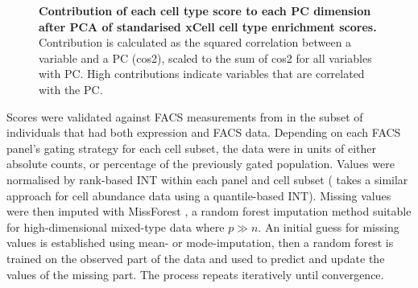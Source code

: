 \begin{figure}
\begin{subfigure}[b]{0.65\textwidth}
    \end{subfigure}
    \caption{
        \textbf{
            Contribution of each cell type score to each \gls{PC} dimension after \gls{PCA} of standarised xCell cell type enrichment scores. 
        }
        Contribution is calculated as the squared correlation between a variable and a \gls{PC} (cos2), 
        scaled to the sum of cos2 for all variables with \gls{PC}.
        High contributions indicate variables that are correlated with the \gls{PC}.
    }
    \label{fig:hird_xCell_cos2}
\end{figure}

Scores were validated against \gls{FACS} measurements from \textcite{sobolev2016AdjuvantedInfluenzaH1N1Vaccination} in the subset of  individuals that had both expression and \gls{FACS} data.
Depending on each \gls{FACS} panel's gating strategy for each cell subset, the data were in units of either absolute counts, or percentage of the previously gated population.
Values were normalised by rank-based \gls{INT} within each panel and cell subset (\autocite{astle2016AllelicLandscapeHuman} takes a similar approach for cell abundance data using a quantile-based \gls{INT}).
%
Missing values were then imputed with MissForest \autocite{stekhoven2012MissForestNonparametricMissing}, a random forest imputation method suitable for high-dimensional mixed-type data where $p \gg n$.
An initial guess for missing values is established using mean- or mode-imputation, then a random forest is trained on the observed part of the data and used to predict and update the values of the missing part.
The process repeats iteratively until convergence.

